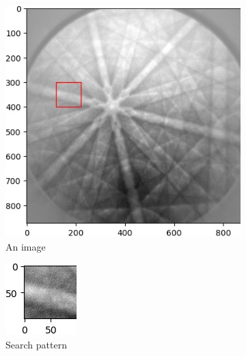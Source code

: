 \begin{figure}
	\centering
	\begin{subfigure}{.4\textwidth}
		\centering
		\includegraphics[width=\linewidth]{img/normalized_initial}
		\caption{An image}
		\label{roi-shifts:initial}
	\end{subfigure}
	\begin{subfigure}{.4\textwidth}
		\centering
		\includegraphics[width=0.4\linewidth]{img/normalized_pattern}
		\caption{Search pattern}
		\label{fig:sub2}
	\end{subfigure}
	\begin{subfigure}{.49\textwidth}
		\centering

\end{subfigure}
\end{figure}
